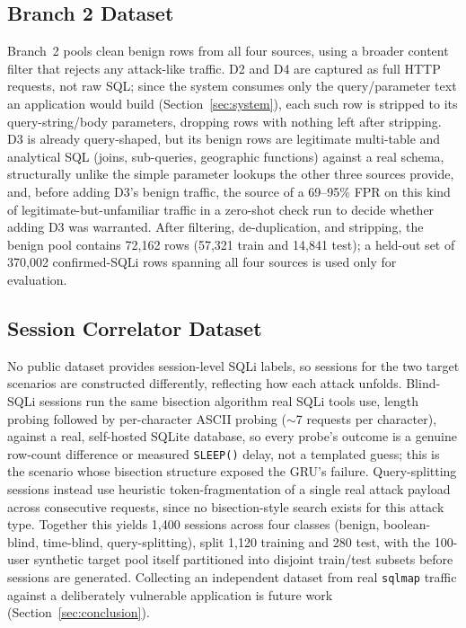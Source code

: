 \documentclass[conference]{IEEEtran}
\begin{document}
\subsection{Branch 2 Dataset}
Branch~2 pools clean benign rows from all four sources, using a broader content filter that rejects any attack-like traffic. D2 and D4 are captured as full HTTP requests, not raw SQL; since the system consumes only the query/parameter text an application would build (Section~\ref{sec:system}), each such row is stripped to its query-string/body parameters, dropping rows with nothing left after stripping. D3 is already query-shaped, but its benign rows are legitimate multi-table and analytical SQL (joins, sub-queries, geographic functions) against a real schema, structurally unlike the simple parameter lookups the other three sources provide, and, before adding D3's benign traffic, the source of a 69--95\% FPR on this kind of legitimate-but-unfamiliar traffic in a zero-shot check run to decide whether adding D3 was warranted. After filtering, de-duplication, and stripping, the benign pool contains 72{,}162 rows (57{,}321 train and 14{,}841 test); a held-out set of 370{,}002 confirmed-SQLi rows spanning all four sources is used only for evaluation.

\subsection{Session Correlator Dataset}
No public dataset provides session-level SQLi labels, so sessions for the two target scenarios are constructed differently, reflecting how each attack unfolds. Blind-SQLi sessions run the same bisection algorithm real SQLi tools use, length probing followed by per-character ASCII probing ($\sim$7 requests per character), against a real, self-hosted SQLite database, so every probe's outcome is a genuine row-count difference or measured \texttt{SLEEP()} delay, not a templated guess; this is the scenario whose bisection structure exposed the GRU's failure. Query-splitting sessions instead use heuristic token-fragmentation of a single real attack payload across consecutive requests, since no bisection-style search exists for this attack type. Together this yields 1{,}400 sessions across four classes (benign, boolean-blind, time-blind, query-splitting), split 1{,}120 training and 280 test, with the 100-user synthetic target pool itself partitioned into disjoint train/test subsets before sessions are generated. Collecting an independent dataset from real \texttt{sqlmap} traffic against a deliberately vulnerable application is future work (Section~\ref{sec:conclusion}).
\end{document}
